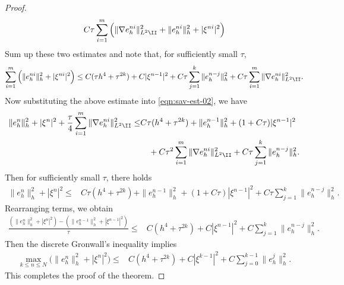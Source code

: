 \begin{proof}
\begin{equation*}
\begin{split}
 C\tau \sum_{i=1}^m \Big(\| \nabla e_h^{ni}  \|_{L^2\II}^2 + \|  e_h^{ni}  \|_{h}^2 + |\xi^{ni}|^2 \Big)
\end{split}
\end{equation*}
Sum up these two estimates and note that,
for sufficiently small $\tau$,
\begin{equation*}
\begin{split}
 \sum_{i=1}^m \Big(\|e_h^{ni}\|_h^2+ |\xi^{ni}|^2\Big)  \le C(\tau h^4 + \tau^{2k})+C|\xi^{n-1}|^2
 + C\tau \sum_{j=1}^k \| e_h^{n-j} \|_h^2 +
 C\tau \sum_{i=1}^m \| \nabla e_h^{ni}  \|_{L^2\II}^2.
\end{split}
\end{equation*}
Now substituting the above estimate into \eqref{eqn:sav-est-02}, we have
\begin{equation*}%
\begin{split}
 \|e_h^{n}\|_h^2 + |\xi^n|^2 + \frac\tau4 \sum_{i=1}^m \| \nabla e_h^{ni} \|_{L^2\II}^2
 \le&  C\tau(h^4+ \tau^{2k}) +  \|e_h^{n-1}\|_h^2 + (1+C \tau) |\xi^{n-1}|^2   \\
&\quad + C\tau^2 \sum_{i=1}^m \| \nabla e_h^{ni}  \|_{L^2\II}^2
+ C\tau  \sum_{j=1}^{k} \|  e_h^{n-j} \|_h^2.
\end{split}
\end{equation*}
Then for sufficiently small $\tau$, there holds
\begin{equation*}
\begin{split}
 \|e_h^{n}\|_h^2 + |\xi^n|^2
 \le&  C\tau(h^4+ \tau^{2k}) +  \|e_h^{n-1}\|_h^2 + (1+C \tau) |\xi^{n-1}|^2   + C\tau  \sum_{j=1}^{k} \|  e_h^{n-j} \|_h^2.
\end{split}
\end{equation*}
Rearranging terms, we obtain
\begin{equation*}
\begin{split}
 \frac{(\|e_h^{n}\|_h^2 + |\xi^n|^2) - (\|e_h^{n-1}\|_h^2 + |\xi^{n-1}|^2)}{\tau}
 \le&  C (h^4+ \tau^{2k})  + C |\xi^{n-1}|^2   + C \sum_{j=1}^{k} \|  e_h^{n-j} \|_h^2.
\end{split}
\end{equation*}
Then the discrete Gronwall's inequality implies
\begin{equation*}
\begin{split}
\max_{k \le n\le N} \Big(\|e_h^{n}\|_h^2 + |\xi^n|^2\Big)
 \le&  C (h^4+ \tau^{2k})  + C |\xi^{k-1}|^2    + C \sum_{j=0}^{k-1} \|  e_h^{j} \|_h^2.
\end{split}
\end{equation*}
This completes the proof of the theorem.
\end{proof}




